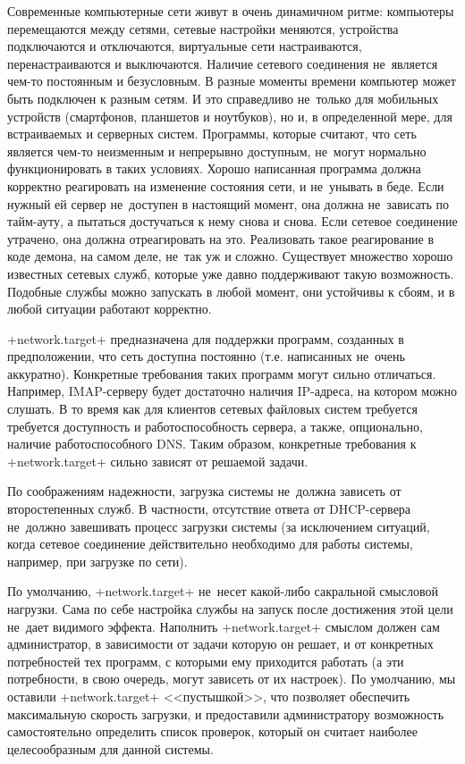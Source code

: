 \documentclass[10pt,oneside,a4paper]{article}
\begin{document}
Современные компьютерные сети живут в очень динамичном ритме: компьютеры
перемещаются между сетями, сетевые настройки меняются, устройства подключаются и
отключаются, виртуальные сети настраиваются, перенастраиваются и выключаются.
Наличие сетевого соединения не~является чем-то постоянным и безусловным. В
разные моменты времени компьютер может быть подключен к разным сетям. И это
справедливо не~только для мобильных устройств (смартфонов, планшетов и
ноутбуков), но и, в определенной мере, для встраиваемых и серверных систем. 
Программы, которые считают, что сеть является чем-то неизменным и непрерывно
доступным, не~могут нормально функционировать в таких условиях. Хорошо
написанная программа должна корректно реагировать на изменение состояния сети, и
не~унывать в беде. Если нужный ей сервер не~доступен в настоящий момент, она
должна не~зависать по тайм-ауту, а пытаться достучаться к нему снова и снова.
Если сетевое соединение утрачено, она должна отреагировать на это. Реализовать
такое реагирование в коде демона, на самом деле, не~так уж и сложно. Существует
множество хорошо известных сетевых служб, которые уже давно поддерживают такую
возможность. Подобные службы можно запускать в любой момент, они устойчивы к
сбоям, и в любой ситуации работают корректно.

+network.target+ предназначена для поддержки программ, созданных в
предположении, что сеть доступна постоянно (т.е. написанных не~очень аккуратно).
Конкретные требования таких программ могут сильно отличаться. Например,
IMAP-серверу будет достаточно наличия IP-адреса, на котором можно слушать. В то
время как для клиентов сетевых файловых систем требуется требуется доступность и
работоспособность сервера, а также, опционально, наличие работоспособного DNS.
Таким образом, конкретные требования к +network.target+ сильно зависят от
решаемой задачи.

По соображениям надежности, загрузка системы не~должна зависеть от второстепенных
служб. В частности, отсутствие ответа от DHCP-сервера не~должно завешивать
процесс загрузки системы (за исключением ситуаций, когда сетевое соединение
действительно необходимо для работы системы, например, при загрузке по сети).

По умолчанию, +network.target+ не~несет какой-либо сакральной смысловой
нагрузки. Сама по себе настройка службы на запуск после достижения этой цели
не~дает видимого эффекта. Наполнить +network.target+ смыслом должен сам
администратор, в зависимости от задачи которую он решает, и от конкретных 
потребностей тех программ, с которыми ему приходится работать (а эти
потребности, в свою очередь, могут зависеть от их настроек). По умолчанию, мы
оставили +network.target+ <<пустышкой>>, что позволяет обеспечить максимальную
скорость загрузки, и предоставили администратору возможность самостоятельно
определить список проверок, который он считает наиболее целесообразным для
данной системы.
\end{document}
